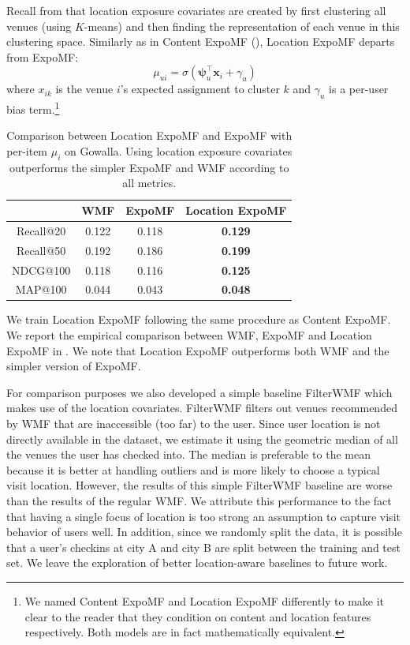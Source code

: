 Recall from  that location exposure covariates are created
by first clustering all venues (using $K$-means) and then finding the
representation of each venue in this clustering space. Similarly as in Content
ExpoMF (), Location ExpoMF departs from ExpoMF:
\begin{displaymath} \mu_{ui}= \sigma(\boldsymbol\psi_u^\top \mathbf{x}_i + \gamma_u)\end{displaymath}
where $x_{ik}$ is the venue $i$'s expected assignment to cluster $k$ and
$\gamma_u$ is a per-user bias term.\footnote{We named Content ExpoMF
and Location ExpoMF differently to make it clear to the reader that they
condition on content and location features respectively. Both models are
in fact mathematically equivalent.}

\begin{table}
\centering
\begin{tabular}{c c c c}
\hline
            & WMF & ExpoMF & Location ExpoMF \\ \hline
  Recall@20 & 0.122 & 0.118 & \textbf{0.129} \\
  Recall@50 & 0.192 & 0.186 & \textbf{0.199} \\
  NDCG@100  & 0.118 & 0.116 & \textbf{0.125} \\
  MAP@100   & 0.044 & 0.043 & \textbf{0.048} \\
\hline
\end{tabular}
\caption{Comparison between Location ExpoMF and ExpoMF with per-item
$\mu_i$ on Gowalla. Using location exposure covariates outperforms the
simpler ExpoMF and WMF according to all metrics.}
\label{tab:si_location_results}
\end{table}



 We train Location ExpoMF following the same procedure as
Content ExpoMF. We report the empirical comparison between WMF, ExpoMF and
Location ExpoMF in . We note that Location
ExpoMF outperforms both WMF and the simpler version of ExpoMF. 

For comparison purposes we also developed a simple baseline FilterWMF which makes use of the
location covariates. FilterWMF filters out venues recommended by WMF that are inaccessible (too far) to the user. Since user
location is not directly available in the dataset, we estimate it using the
geometric median of all the venues the user has checked into. 
The median is preferable to the mean because it is better at handling outliers and is more likely to choose a typical visit location. 
However, the results of this simple FilterWMF baseline are worse than the results of the
regular WMF. We attribute this performance to the fact that having a single focus of location 
is too strong an assumption to capture visit behavior of users well. 
In addition, since we randomly split the data, it is possible that a user's
checkins at city A and city B are split between the training and test set.
We leave the exploration of better location-aware baselines to future work. 


